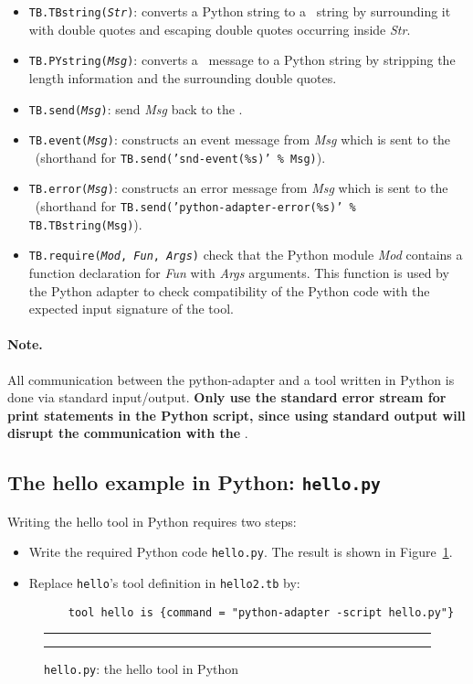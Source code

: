 \begin{itemize} 
\item \texttt{TB.TBstring(\emph{Str\/})}: converts a Python string to
  a \TB\ string by surrounding it with double quotes and escaping
  double quotes occurring inside \emph{Str\/}.
\item \texttt{TB.PYstring(\emph{Msg\/})}: converts a \TB\ message to a
  Python string by stripping the length information and the
  surrounding double quotes.
\item \texttt{TB.send(\emph{Msg\/})}: send \emph{Msg\/} back to the
  \TB.
\item \texttt{TB.event(\emph{Msg\/})}: constructs an event message
  from \emph{Msg\/} which is sent to the \TB\ (shorthand for
  \texttt{TB.send('snd-event(\%s)' \% Msg)}).
\item \texttt{TB.error(\emph{Msg\/})}: constructs an error message
  from \emph{Msg\/} which is sent to the \TB\ (shorthand for
  \texttt{TB.send('python-adapter-error(\%s)' \% TB.TBstring(Msg)}).
\item \texttt{TB.require(\emph{Mod}, \emph{Fun}, \emph{Args\/})} check
  that the Python module \emph{Mod} contains a function declaration for
  \emph{Fun} with \emph{Args} arguments. This function is used by the
  Python adapter to check compatibility of the Python code
  with the expected input signature of the tool.
\end{itemize}

\paragraph{Note.} 

All communication between the python-adapter and a tool written
in Python is done via standard input/output. {\bf Only use the
standard error stream for print statements in the Python script,
since using standard output will disrupt the communication with the
\TB}.

\subsection{\label{Ex-hello.py}
  The hello example in Python: \texttt{hello.py}} 

Writing the hello tool in Python requires two steps:
\begin{itemize}
\item Write the required Python code \texttt{hello.py}. 
  The result is shown in Figure~\ref{fig:hello.py}.
\item Replace \texttt{hello}'s tool definition in \texttt{hello2.tb} by:
\begin{verbatim}
      tool hello is {command = "python-adapter -script hello.py"}
\end{verbatim}
\end{itemize}

\begin{figure}[t]
\rule{\textwidth}{0.5mm}

\caption{\label{fig:hello.py}\texttt{hello.py}: the hello tool in Python}
\rule{\textwidth}{0.5mm}
\end{figure}

